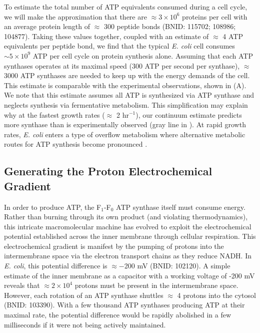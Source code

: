 To estimate the total number of ATP equivalents consumed during a cell cycle, we
will make the approximation that there are $\approx 3\times10^6$ proteins per
cell with an average protein length of $\approx$ 300 peptide bonds (BNID:
115702; 108986; 104877). Taking these values together, coupled with an estimate
of $\approx$ 4 ATP equivalents per peptide bond, we find that the typical
\textit{E. coli} cell consumes $\sim 5 \times 10^9$ ATP per cell cycle on
protein synthesis alone. Assuming that each ATP synthases operates at its
maximal speed (300 ATP per second per synthase), $\approx$ 3000 ATP synthases
are needed to keep up with the energy demands of the cell. This estimate
is comparable with the experimental observations,  shown in
 (A). We note that this estimate assumes all ATP is
synthesized via ATP synthase and neglects synthesis via fermentative metabolism.
This simplification may explain why at the fastest growth rates ($\approx$ 2
hr$^{-1}$), our continuum estimate predicts more synthase than is experimentally
observed (gray line in ). At rapid growth rates,
\textit{E. coli} enters a type of overflow metabolism where alternative
metabolic routes for ATP synthesis become pronounced \citep{molenaar2009, szenk2017}.

\subsection{Generating the Proton Electrochemical Gradient}
In order to produce ATP, the F$_1$-F$_0$ ATP synthase itself must consume
energy. Rather than burning through its own product (and violating
thermodynamics), this intricate macromolecular machine has evolved to exploit
the electrochemical potential established across the inner membrane through
cellular respiration. This electrochemical gradient is manifest by the pumping
of protons into the intermembrane space via the electron transport chains as
they reduce NADH. In \textit{E. coli}, this potential difference is $\approx
-$200 mV (BNID: 102120). A simple estimate of the inner membrane as a capacitor
with a working voltage of -200 mV reveals that $\approx 2\times 10^4$ protons
must be present in the intermembrane space. However, each rotation of an ATP
synthase shuttles $\approx$ 4 protons into the cytosol (BNID: 103390). With a few thousand ATP
synthases producing ATP at their maximal rate, the potential difference would be
rapidly abolished in a few milliseconds if it were not being actively
maintained.

